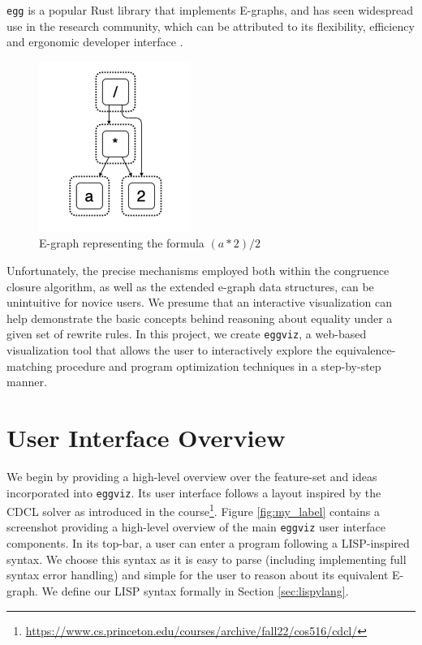 \documentclass[letterpaper,twocolumn,11pt]{article}
\begin{document}
\texttt{egg} is a popular Rust library that implements E-graphs, and has seen
widespread use in the research community, which can be attributed to its
flexibility, efficiency and ergonomic developer interface \cite{egg}.

\begin{figure}[t]
    \centering
    \includegraphics[width=.5\columnwidth]{egraph.png}
    \caption{E-graph representing the formula $(a * 2) / 2$ \cite{egg}}
    \label{fig:egraph}
\end{figure}

Unfortunately, the precise mechanisms employed both within the congruence
closure algorithm, as well as the extended e-graph data structures, can be
unintuitive for novice users. We presume that an interactive visualization can
help demonstrate the basic concepts behind reasoning about equality under a
given set of rewrite rules. In this project, we create \texttt{eggviz}, a
web-based visualization tool that allows the user to interactively explore the
equivalence-matching procedure and program optimization techniques in a
step-by-step manner.

\section{User Interface Overview}

We begin by providing a high-level overview over the feature-set and ideas
incorporated into \texttt{eggviz}. Its user interface follows a layout inspired
by the CDCL solver as introduced in the
course\footnote{\url{https://www.cs.princeton.edu/courses/archive/fall22/cos516/cdcl/}}.
Figure \ref{fig:my_label} contains a screenshot providing a high-level overview
of the main \texttt{eggviz} user interface components. In its top-bar, a user
can enter a program following a LISP-inspired syntax. We choose this syntax as
it is easy to parse (including implementing full syntax error handling) and
simple for the user to reason about its equivalent E-graph. We define our LISP
syntax formally in Section \ref{sec:lispylang}.
\end{document}
